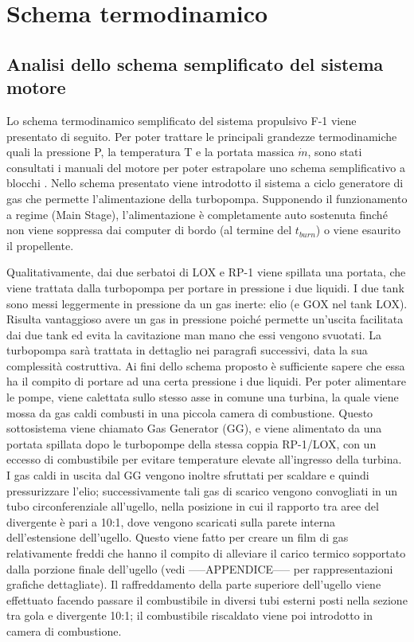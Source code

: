 \section{Schema termodinamico}
\label{sec:schema termodinamico}

\subsection{Analisi dello schema semplificato del sistema motore}
\label{subsec:schema semplificato}

Lo schema termodinamico semplificato del sistema propulsivo F-1 viene presentato di seguito. Per poter trattare le principali grandezze termodinamiche quali la pressione P, la temperatura T e la portata massica $ \dot{m} $, sono stati consultati i manuali del motore per poter estrapolare uno schema semplificativo a blocchi \cite{engine_manual}.
Nello schema presentato viene introdotto il sistema a ciclo generatore di gas che permette l’alimentazione della turbopompa. Supponendo il funzionamento a regime (Main Stage), l’alimentazione è completamente auto sostenuta finché non viene soppressa dai computer di bordo (al termine del $ t_{burn} $) o viene esaurito il propellente.

Qualitativamente, dai due serbatoi di LOX e RP-1 viene spillata una portata, che viene trattata dalla turbopompa per portare in pressione i due liquidi. I due tank sono messi leggermente in pressione da un gas inerte: elio (e GOX nel tank LOX).
Risulta vantaggioso avere un gas in pressione poiché permette un'uscita facilitata dai due tank ed evita la cavitazione man mano che essi vengono svuotati. La turbopompa sarà trattata in dettaglio nei paragrafi successivi, data la sua complessità costruttiva.
Ai fini dello schema proposto è sufficiente sapere che essa ha il compito di portare ad una certa pressione i due liquidi. Per poter alimentare le pompe, viene calettata sullo stesso asse in comune una turbina, la quale viene mossa da gas caldi combusti in una piccola camera di combustione.
Questo sottosistema viene chiamato Gas Generator (GG), e viene alimentato da una portata spillata dopo le turbopompe della stessa coppia RP-1/LOX, con un eccesso di combustibile per evitare temperature elevate all'ingresso della turbina.
I gas caldi in uscita dal GG vengono inoltre sfruttati per scaldare e quindi pressurizzare l’elio; successivamente tali gas di scarico vengono convogliati in un tubo circonferenziale all’ugello, nella posizione in cui il rapporto tra aree del divergente è pari a 10:1, dove vengono scaricati sulla parete interna dell’estensione dell’ugello.
Questo viene fatto per creare un film di gas relativamente freddi che hanno il compito di alleviare il carico termico sopportato dalla porzione finale dell'ugello (vedi -----APPENDICE----- per rappresentazioni grafiche dettagliate).
Il raffreddamento della parte superiore dell’ugello viene effettuato facendo passare il combustibile in diversi tubi esterni posti nella sezione tra gola e divergente 10:1; il combustibile riscaldato viene poi introdotto in camera di combustione.

